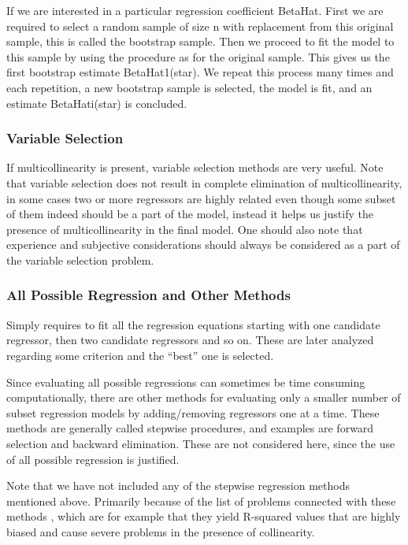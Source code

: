 \documentclass[11pt]{article}
\begin{document}
If we are interested in a particular regression coefficient BetaHat. First we are required to select a random
sample of size n with replacement from this original sample, this is called the bootstrap sample. Then we
proceed to fit the model to this sample by using the procedure as for the original sample. This gives us
the first bootstrap estimate BetaHat1(star). We repeat this process many times and each repetition, a new 
bootstrap sample is selected, the model is fit, and an estimate BetaHati(star) is concluded. 

\subsubsection{Variable Selection}
\label{sec:orgb602509}

If multicollinearity is present, variable selection methods are very useful. Note that variable selection does
not result in complete elimination of multicollinearity, in some cases two or more regressors are highly related 
even though some subset of them indeed should be a part of the model, instead it helps us justify the presence
of multicollinearity in the final model. One should also note that experience and subjective considerations
should always be considered as a part of the variable selection problem.

\subsubsection{All Possible Regression and Other Methods}
\label{sec:org8f681b7}

Simply requires to fit all the regression equations starting with one candidate regressor, then two
candidate regressors and so on. These are later analyzed regarding some criterion and the “best” one is selected. 

Since evaluating all possible regressions can sometimes be time consuming computationally, there are other
methods for evaluating only a smaller number of subset regression models by adding/removing regressors one
at a time. These methods are generally called stepwise procedures, and examples are forward selection and backward
elimination. These are not considered here, since the use of all possible regression is justified.

Note that we have not included any of the stepwise regression methods mentioned above. Primarily
because of the list of problems connected with these methods \cite{20856}, which are for example that they yield
R-squared values that are highly biased and cause severe problems in the presence of collinearity.
\end{document}
